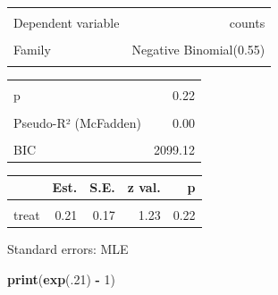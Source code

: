 \documentclass[
]{article}
\newenvironment{Shaded}{\begin{snugshade}}{\end{snugshade}}
\newcommand{\DecValTok}[1]{\textcolor[rgb]{0.00,0.00,0.81}{#1}}
\newcommand{\FunctionTok}[1]{\textcolor[rgb]{0.13,0.29,0.53}{\textbf{#1}}}
\newcommand{\NormalTok}[1]{#1}
\newcommand{\SpecialCharTok}[1]{\textcolor[rgb]{0.81,0.36,0.00}{\textbf{#1}}}
\begin{document}
\begin{table}[!h]
\centering
\begin{tabular}{lr}
\toprule
\cellcolor{gray!10}{Observations} & \cellcolor{gray!10}{252}\\
Dependent variable & counts\\
\cellcolor{gray!10}{Type} & \cellcolor{gray!10}{Generalized linear model}\\
Family & Negative Binomial(0.55)\\
\cellcolor{gray!10}{Link} & \cellcolor{gray!10}{log}\\
\bottomrule
\end{tabular}
\end{table} \begin{table}[!h]
\centering
\begin{tabular}{lr}
\toprule
\cellcolor{gray!10}{$\chi^2$(250)} & \cellcolor{gray!10}{1.52}\\
p & 0.22\\
\cellcolor{gray!10}{Pseudo-R² (Cragg-Uhler)} & \cellcolor{gray!10}{0.01}\\
Pseudo-R² (McFadden) & 0.00\\
\cellcolor{gray!10}{AIC} & \cellcolor{gray!10}{2088.53}\\
\addlinespace
BIC & 2099.12\\
\bottomrule
\end{tabular}
\end{table} \begin{table}[!h]
\centering
\begin{threeparttable}
\begin{tabular}{lrrrr}
\toprule
  & Est. & S.E. & z val. & p\\
\midrule
\cellcolor{gray!10}{(Intercept)} & \cellcolor{gray!10}{3.12} & \cellcolor{gray!10}{0.12} & \cellcolor{gray!10}{26.40} & \cellcolor{gray!10}{0.00}\\
treat & 0.21 & 0.17 & 1.23 & 0.22\\
\bottomrule
\end{tabular}
\begin{tablenotes}
\item Standard errors: MLE
\end{tablenotes}
\end{threeparttable}
\end{table}

\begin{Shaded}
\begin{Highlighting}[]
\FunctionTok{print}\NormalTok{(}\FunctionTok{exp}\NormalTok{(.}\DecValTok{21}\NormalTok{) }\SpecialCharTok{{-}} \DecValTok{1}\NormalTok{)}
\end{Highlighting}
\end{Shaded}
\end{document}
